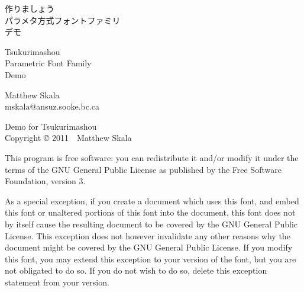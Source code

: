 \documentclass[14pt]{extarticle}
\begin{document}
\pagestyle{plain}\thispagestyle{empty}


\kaku
\begin{center}\LARGE

\vspace*{\fill}

{\Huge 作りましょう~\TsukurimashouVWide}\\
{\huge パラメタ方式フォントファミリ\\
デモ}

\vspace*{0.75in}

{\Huge Tsukurimashou~\TsukurimashouVersion}\\
{\huge Parametric Font Family\\
Demo}

\vspace*{1.5in}

Matthew Skala\\
mskala@ansuz.sooke.bc.ca\\
\TsukurimashouRDWide\qquad\TsukurimashouReleaseDate

\vspace*{\fill}

\end{center}
\clearpage


\vspace*{\fill}

Demo for Tsukurimashou\\
Copyright © 2011~~Matthew Skala

This program is free software: you can redistribute it and/or modify
it under the terms of the GNU General Public License as published by
the Free Software Foundation, version 3.

As a special exception, if you create a document which uses this font, and
embed this font or unaltered portions of this font into the document, this
font does not by itself cause the resulting document to be covered by the
GNU General Public License. This exception does not however invalidate any
other reasons why the document might be covered by the GNU General Public
License. If you modify this font, you may extend this exception to your
version of the font, but you are not obligated to do so. If you do not
wish to do so, delete this exception statement from your version.
\end{document}
